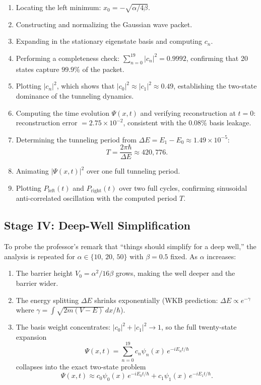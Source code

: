 \documentclass[11pt,a4paper]{article}
\begin{document}
\begin{enumerate}
    \item Locating the left minimum: $x_0 = -\sqrt{\alpha/4\beta}$.
    \item Constructing and normalizing the Gaussian wave packet.
    \item Expanding in the stationary eigenstate basis and computing $c_n$.
    \item Performing a completeness check: $\displaystyle\sum_{n=0}^{19}|c_n|^2 = 0.9992$, confirming that 20 states capture $99.9\%$ of the packet.
    \item Plotting $|c_n|^2$, which shows that $|c_0|^2\approx|c_1|^2\approx 0.49$, establishing the two-state dominance of the tunneling dynamics.
    \item Computing the time evolution $\Psi(x,t)$ and verifying reconstruction at $t=0$: reconstruction error $= 2.75\times10^{-2}$, consistent with the $0.08\%$ basis leakage.
    \item Determining the tunneling period from $\Delta E = E_1 - E_0 \approx 1.49\times10^{-5}$:
    \begin{equation}
        T = \frac{2\pi\hbar}{\Delta E} \approx 420{,}776.
    \end{equation}
    \item Animating $|\Psi(x,t)|^2$ over one full tunneling period.
    \item Plotting $P_{\text{left}}(t)$ and $P_{\text{right}}(t)$ over two full cycles, confirming sinusoidal anti-correlated oscillation with the computed period $T$.
\end{enumerate}

\subsection{Stage IV: Deep-Well Simplification}

To probe the professor's remark that ``things should simplify for a deep well,'' the analysis is repeated for $\alpha \in \{10,\,20,\,50\}$ with $\beta=0.5$ fixed. As $\alpha$ increases:

\begin{enumerate}
    \item The barrier height $V_0 = \alpha^2/16\beta$ grows, making the well deeper and the barrier wider.
    \item The energy splitting $\Delta E$ shrinks exponentially (WKB prediction: $\Delta E\propto e^{-\gamma}$ where $\gamma=\int\sqrt{2m(V-E)}\,dx/\hbar$).
    \item The basis weight concentrates: $|c_0|^2+|c_1|^2\to 1$, so the full twenty-state expansion
    \begin{equation}
        \Psi(x,t)=\sum_{n=0}^{19}c_n\psi_n(x)\,e^{-iE_nt/\hbar}
    \end{equation}
    collapses into the exact two-state problem
    \begin{equation}
        \Psi(x,t)\approx c_0\psi_0(x)\,e^{-iE_0t/\hbar}+c_1\psi_1(x)\,e^{-iE_1t/\hbar}.
    \end{equation}
\end{enumerate}
\end{document}
